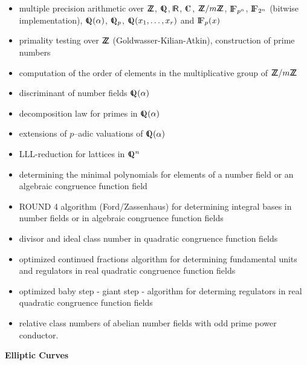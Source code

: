 \begin{itemize}
\item multiple precision arithmetic over ${{\sf Z}\hspace{-1.3mm}{\sf Z}}$, $\Q$, $\R$, $\C$,
${{\sf Z}\hspace{-1.3mm}{\sf Z}}/m{{\sf Z}\hspace{-1.3mm}{\sf Z}}$, ${\rm{I\!F}}_{p^n}$, ${\rm{I\!F}}_{2^n}$ (bitwise implementation), $\Q(\alpha)$,
$\Q_p$, $\Q(x_1, \ldots, x_r)$ and ${\rm{I\!F}}_p(x)$
\item primality testing over ${{\sf Z}\hspace{-1.3mm}{\sf Z}}$ (Goldwasser-Kilian-Atkin), construction of prime numbers
\item computation of the order of elements in the multiplicative group
of ${{\sf Z}\hspace{-1.3mm}{\sf Z}}/m{{\sf Z}\hspace{-1.3mm}{\sf Z}}$
\item discriminant of number fields $\Q(\alpha)$
\item decomposition law for primes in $\Q(\alpha)$ 
\item extensions of $p$--adic valuations of $\Q(\alpha)$
\item LLL-reduction for lattices in $\Q^n$ 
\item determining the minimal polynomials for elements of a number field or
	an algebraic congruence function field
\item ROUND 4 algorithm (Ford/Zassenhaus) for determining integral bases
	in number fields or in algebraic congruence function fields 
\item divisor and ideal class number in quadratic congruence function fields 
\item optimized continued fractions algorithm for determining 
	fundamental units and regulators in real quadratic 
	congruence function fields	
\item optimized baby step - giant step - algorithm for determing
	regulators in real quadratic congruence function fields 
\item relative class numbers of abelian number fields with odd prime
power conductor.
\end{itemize}

\vspace{0.4cm}

\begin{center}
{\large {\bf Elliptic Curves}}
\end{center}

